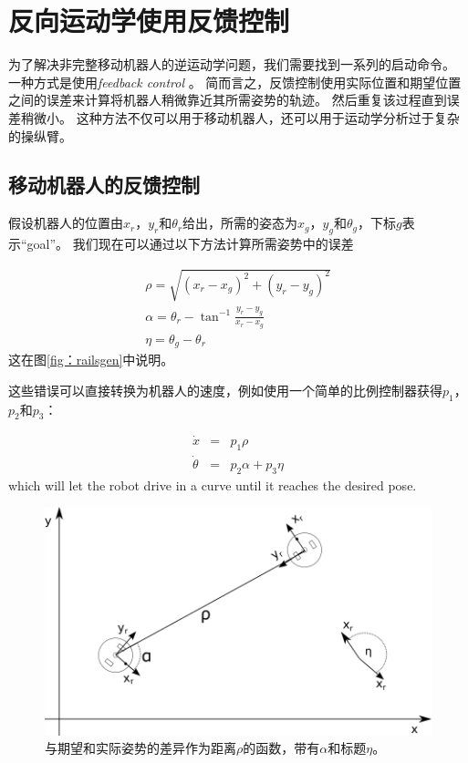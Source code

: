 \section{反向运动学使用反馈控制} 
\label{sec:advinvkinematics}
为了解决非完整移动机器人的逆运动学问题，我们需要找到一系列的启动命令。 一种方式是使用\emph {feedback control} 。 简而言之，反馈控制使用实际位置和期望位置之间的误差来计算将机器人稍微靠近其所需姿势的轨迹。 然后重复该过程直到误差稍微小。 这种方法不仅可以用于移动机器人，还可以用于运动学分析过于复杂的操纵臂。

\subsection {移动机器人的反馈控制} \label {sec：fbmobile}
假设机器人的位置由$ x_r，y_r $和$ \theta_r $给出，所需的姿态为$ x_g，y_g $和$ \theta_g $，下标$ g $表示“goal”。
我们现在可以通过以下方法计算所需姿势中的误差

\begin{eqnarray}
\rho=\sqrt{(x_r-x_g)^2+(y_r-y_g)^2}\\
\nonumber
\alpha=\theta_r-\tan^{-1}{\frac{y_r-y_g}{x_r-x_g}}\\
\nonumber
\eta=\theta_g-\theta_r
\end{eqnarray}
这在图\ref {fig：railsgen}中说明。


这些错误可以直接转换为机器人的速度，例如使用一个简单的比例控制器获得$ p_1 $，$ p_2 $和$ p_3 $：

\begin{eqnarray}
\dot{x} &=& p_1 \rho\\
\dot{\theta} &=& p_2 \alpha + p_3 \eta
\end{eqnarray}
which will let the robot drive in a curve until it reaches the desired pose. 

\begin{figure}
	\centering
		\includegraphics[width=\textwidth]{figs/trajectorygen}
	\caption {与期望和实际姿势的差异作为距离$ \rho $的函数，带有$ \alpha $和标题$ \eta $。}
	\label{fig:trajectorygen}
\end{figure}


